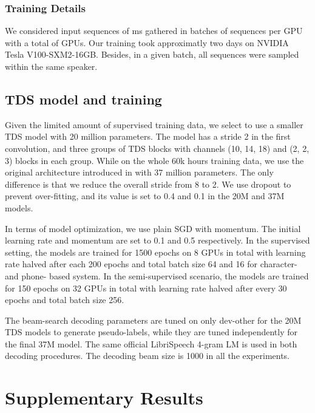 \documentclass{article}
\begin{document}
\subsubsection{Training Details}

We considered input sequences of ms gathered in batches of  sequences per GPU with a total of  GPUs.
Our training took approximatly two days on NVIDIA Tesla V100-SXM2-16GB.
Besides, in a given batch, all sequences were sampled within the same speaker.


\subsection{TDS model and training}
Given the limited amount of supervised training data, we select to use a smaller TDS model \cite{hannun2019tds} with 20 million parameters. The model has a stride 2 in the first convolution, and three groups of TDS blocks with channels (10, 14, 18) and (2, 2, 3) blocks in each group. While on the whole 60k hours training data, we use the original architecture introduced in \cite{hannun2019tds} with 37 million parameters. The only difference is that we reduce the overall stride from 8 to 2. We use dropout to prevent over-fitting, and its value is set to 0.4 and 0.1 in the 20M and 37M models.

In terms of model optimization, we use plain SGD with momentum. The initial learning rate and momentum are set to 0.1 and 0.5 respectively. In the supervised setting, the models are trained for 1500 epochs on 8 GPUs in total with learning rate halved after each 200 epochs and total batch size 64 and 16 for character- and phone- based system. In the semi-supervised scenario, the models are trained for 150 epochs on 32 GPUs in total with learning rate halved after every 30 epochs and total batch size 256.

The beam-search decoding parameters are tuned on only dev-other for the 20M TDS models to generate pseudo-labels, while they are tuned independently for the final 37M model. The same official LibriSpeech 4-gram LM is used in both decoding procedures. The decoding beam size is 1000 in all the experiments. 

\section{Supplementary Results}\label{sec:supres}
\end{document}
